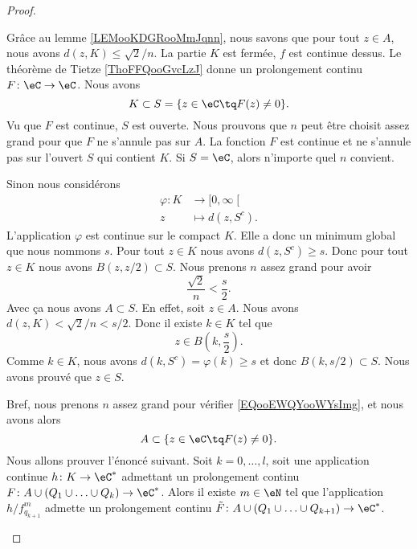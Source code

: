 \begin{proof}
\begin{subproof}
		Grâce au lemme \ref{LEMooKDGRooMmJqnn}, nous savons que pour tout \( z\in A\), nous avons \( d(z,K)\leq \sqrt{ 2 }/n\).
		\spitem[Prolongement]
		La partie \( K\) est fermée, \( f\) est continue dessus. Le théorème de Tietze \ref{ThoFFQooGvcLzJ} donne un prolongement continu \( F\colon \eC\to \eC\). Nous avons
		\begin{equation}
			K\subset S=\{ z\in \eC\tq F(z)\neq 0 \}.
		\end{equation}
		Vu que \( F\) est continue, \( S\) est ouverte.
		\spitem[Grand \( n\)]
		Nous prouvons que \( n\) peut être choisit assez grand pour que \( F\) ne s'annule pas sur \( A\). La fonction \( F\) est continue et ne s'annule pas sur l'ouvert \( S\) qui contient \( K\). Si \( S=\eC\), alors n'importe quel \( n\) convient.

		Sinon nous considérons
		\begin{equation}
			\begin{aligned}
				\varphi\colon K & \to \mathopen[ 0 , \infty \mathclose[ \\
				z               & \mapsto d(z,S^c).
			\end{aligned}
		\end{equation}
		L'application \( \varphi\) est continue sur le compact \( K\). Elle a donc un minimum global que nous nommons \( s\). Pour tout \( z\in K\) nous avons \( d(z,S^c)\geq s\). Donc pour tout \( z\in K\) nous avons \( B(z,z/2)\subset S\). Nous prenons \( n\) assez grand pour avoir
		\begin{equation}        \label{EQooEWQYooWYsImg}
			\frac{ \sqrt{ 2 } }{ n }<\frac{ s }{ 2 }.
		\end{equation}
		Avec ça nous avons \( A\subset S\). En effet, soit \( z\in A\). Nous avons \( d(z,K)<\sqrt{ 2 }/n<s/2\). Donc il existe \( k\in K\) tel que
		\begin{equation}
			z\in B(k,\frac{ s }{2}).
		\end{equation}
		Comme \( k\in K\), nous avons \( d(k,S^c)=\varphi(k)\geq s\) et donc \( B(k,s/2)\subset S\). Nous avons prouvé que \( z\in S\).

		Bref, nous prenons \( n\) assez grand pour vérifier \eqref{EQooEWQYooWYsImg}, et nous avons alors
		\begin{equation}
			A\subset \{ z\in \eC\tq F(z)\neq 0 \}.
		\end{equation}
				\label{SPooVQHTooUNukEE}
		Nous allons prouver l'énoncé suivant. Soit \( k=0,\ldots, l\), soit une application continue \( h\colon K\to \eC^*\) admettant un prolongement continu \( F\colon A\cup(Q_1\cup\ldots\cup Q_k)\to \eC^*\). Alors il existe \( m\in \eN\) tel que l'application \( h/f_{q_{k+1}}^m\) admette un prolongement continu \( \tilde F\colon A\cup(Q_1\cup\ldots\cup Q_{k+1})\to \eC^*\).


\end{subproof}
\end{proof}
